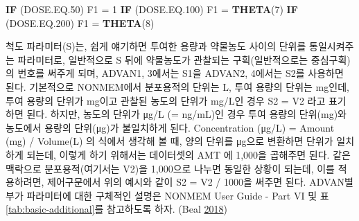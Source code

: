 \documentclass[
  11pt,
  krantz2,
  a4paper]{krantz}
\newenvironment{Shaded}{\begin{snugshade}}{\end{snugshade}}
\newcommand{\DecValTok}[1]{\textcolor[rgb]{0.00,0.00,0.81}{#1}}
\newcommand{\FloatTok}[1]{\textcolor[rgb]{0.00,0.00,0.81}{#1}}
\newcommand{\KeywordTok}[1]{\textcolor[rgb]{0.13,0.29,0.53}{\textbf{#1}}}
\newcommand{\NormalTok}[1]{#1}
\newcommand{\StringTok}[1]{\textcolor[rgb]{0.31,0.60,0.02}{#1}}
\theoremstyle{definition}
\theoremstyle{definition}
\theoremstyle{definition}
\theoremstyle{remark}
\begin{document}
\begin{Shaded}
\begin{Highlighting}[]
\KeywordTok{IF}\NormalTok{ (DOSE.EQ}\FloatTok{.50}\NormalTok{) F1 =}\StringTok{ }\DecValTok{1}
\KeywordTok{IF}\NormalTok{ (DOSE.EQ}\FloatTok{.100}\NormalTok{) F1 =}\StringTok{ }\KeywordTok{THETA}\NormalTok{(}\DecValTok{7}\NormalTok{)}
\KeywordTok{IF}\NormalTok{ (DOSE.EQ}\FloatTok{.200}\NormalTok{) F1 =}\StringTok{ }\KeywordTok{THETA}\NormalTok{(}\DecValTok{8}\NormalTok{)}
\end{Highlighting}
\end{Shaded}

척도 파라미터(S)는, 쉽게 얘기하면 투여한 용량과 약물농도 사이의 단위를 통일시켜주는 파라미터로, 일반적으로 S 뒤에 약물농도가 관찰되는 구획(일반적으로는 중심구획)의 번호를 써주게 되며, ADVAN1, 3에서는 S1을 ADVAN2, 4에서는 S2를 사용하면 된다. 기본적으로 NONMEM에서 분포용적의 단위는 L, 투여 용량의 단위는 mg인데, 투여 용량의 단위가 mg이고 관찰된 농도의 단위가 mg/L인 경우 S2 = V2 라고 표기하면 된다. 하지만, 농도의 단위가 μg/L (= ng/mL)인 경우 투여 용량의 단위(mg)와 농도에서 용량의 단위(μg)가 불일치하게 된다. Concentration (μg/L) = Amount (mg) / Volume(L) 의 식에서 생각해 볼 때, 양의 단위를 μg으로 변환하면 단위가 일치하게 되는데, 이렇게 하기 위해서는 데이터셋의 AMT 에 1,000을 곱해주면 된다. 같은 맥락으로 분포용적(여기서는 V2)을 1,000으로 나누면 동일한 상황이 되는데, 이를 적용하려면, 제어구문에서 위의 예시와 같이 S2 = V2 / 1000을 써주면 된다. ADVAN별 부가 파라미터에 대한 구체적인 설명은 NONMEM User Guide - Part VI 및 표 \ref{tab:basic-additional}를 참고하도록 하자. (Beal \protect\hyperlink{ref-nonmem}{2018})

\footnotesize
\end{document}
